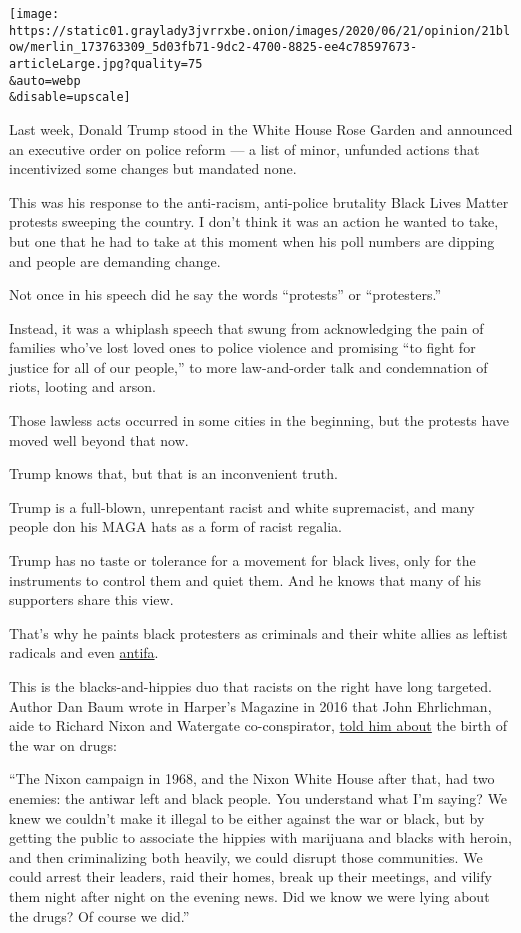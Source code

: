 \texttt{[image: https://static01.graylady3jvrrxbe.onion/images/2020/06/21/opinion/21blow/merlin\_173763309\_5d03fb71-9dc2-4700-8825-ee4c78597673-articleLarge.jpg?quality=75\\\&auto=webp\\\&disable=upscale]}

Last week, Donald Trump stood in the White House Rose Garden and
announced an executive order on police reform --- a list of minor,
unfunded actions that incentivized some changes but mandated none.

This was his response to the anti-racism, anti-police brutality Black
Lives Matter protests sweeping the country. I don't think it was an
action he wanted to take, but one that he had to take at this moment
when his poll numbers are dipping and people are demanding change.

Not once in his speech did he say the words ``protests'' or
``protesters.''

Instead, it was a whiplash speech that swung from acknowledging the pain
of families who've lost loved ones to police violence and promising ``to
fight for justice for all of our people,'' to more law-and-order talk
and condemnation of riots, looting and arson.

Those lawless acts occurred in some cities in the beginning, but the
protests have moved well beyond that now.

Trump knows that, but that is an inconvenient truth.

Trump is a full-blown, unrepentant racist and white supremacist, and
many people don his MAGA hats as a form of racist regalia.

Trump has no taste or tolerance for a movement for black lives, only for
the instruments to control them and quiet them. And he knows that many
of his supporters share this view.

That's why he paints black protesters as criminals and their white
allies as leftist radicals and even
\href{https://www.nytimes3xbfgragh.onion/article/what-antifa-trump.html}{antifa}.

This is the blacks-and-hippies duo that racists on the right have long
targeted. Author Dan Baum wrote in Harper's Magazine in 2016 that John
Ehrlichman, aide to Richard Nixon and Watergate co-conspirator,
\href{https://harpers.org/archive/2016/04/legalize-it-all/}{told him
about} the birth of the war on drugs:

``The Nixon campaign in 1968, and the Nixon White House after that, had
two enemies: the antiwar left and black people. You understand what I'm
saying? We knew we couldn't make it illegal to be either against the war
or black, but by getting the public to associate the hippies with
marijuana and blacks with heroin, and then criminalizing both heavily,
we could disrupt those communities. We could arrest their leaders, raid
their homes, break up their meetings, and vilify them night after night
on the evening news. Did we know we were lying about the drugs? Of
course we did.''

